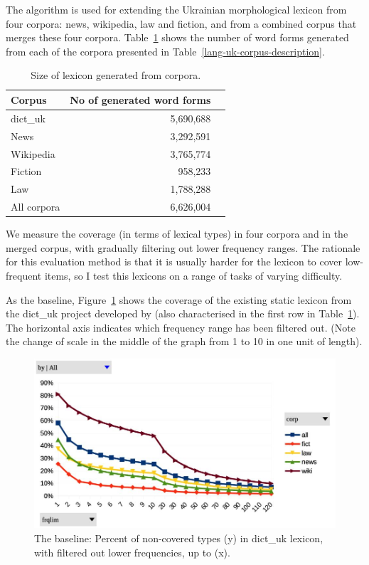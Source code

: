 \documentclass[11pt,a4paper]{article}
\begin{document}
The algorithm is used for extending the Ukrainian morphological lexicon from four corpora: news, wikipedia, law and fiction, and from a combined corpus that merges these four corpora. Table~\ref{lang-uk-corpus-generation} shows the number of word forms generated from each of the corpora presented in Table~\ref{lang-uk-corpus-description}.

\begin{table}[]
	\begin{center}
		\begin{tabular}{|l|rr|}
			\hline \textbf{Corpus} & \textbf{No of generated word forms} & \textbf{ } 
			\\ \hline
			dict\_uk & 5,690,688  &  \\
			\hline
			News & 3,292,591 &  \\
			Wikipedia & 3,765,774 &  \\
			Fiction & 958,233 &  \\
			Law & 1,788,288 &  \\
			\hline
			All corpora & 6,626,004 &  \\
			\hline
		\end{tabular}
	\end{center}
	\caption{\label{lang-uk-corpus-generation} Size of lexicon generated from corpora. }
\end{table}

We measure the coverage (in terms of lexical types) in four corpora and in the merged corpus, with gradually filtering out lower frequency ranges. The rationale for this evaluation method is that it is usually harder for the lexicon to cover low-frequent items, so I test this lexicons on a range of tasks of varying difficulty.

As the baseline, Figure~\ref{fig:pcNoTypDictUK} shows the coverage of the existing static lexicon from the dict\_uk project developed by \cite{Rysin-Starko-2019} (also characterised in the first row in Table~\ref{lang-uk-corpus-generation}). The horizontal axis indicates which frequency range has been filtered out. (Note the change of scale in the middle of the graph from 1 to 10 in one unit of length).

\begin{figure}
	\includegraphics[width=\linewidth]{evaluation-coverage-dict_uk.jpg}
	\caption{The baseline: Percent of non-covered types (y) in dict\_uk lexicon, with filtered out lower frequencies, up to (x).}
	\label{fig:pcNoTypDictUK}
\end{figure}
\end{document}
